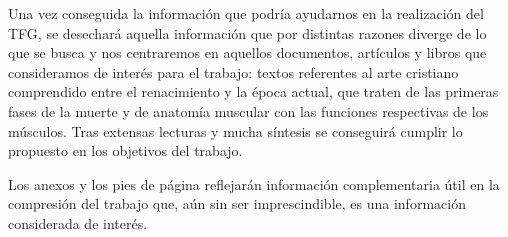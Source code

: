 Una vez conseguida la información que podría ayudarnos en la realización del TFG, se desechará aquella información que por distintas razones diverge de lo que se busca y nos centraremos en aquellos documentos, artículos y libros que consideramos de interés para el trabajo: textos referentes al arte cristiano comprendido entre el renacimiento y la época actual, que traten de las primeras fases de la muerte y de anatomía muscular con las funciones respectivas de los músculos. Tras extensas lecturas y mucha síntesis se conseguirá cumplir lo propuesto en los objetivos del trabajo.

Los anexos y los pies de página reflejarán información complementaria útil en la compresión del trabajo que, aún sin ser imprescindible, es una información considerada de interés.